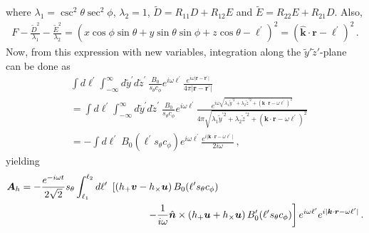\documentclass[a4paper,11pt]{article}
\begin{document}
%
where $ \lambda_{1} = \csc^{2} \theta \sec^{2} \phi $, $ \lambda_{2} = 1 $, $\tilde{D} = R_{11} D + R_{12} E$ and $ \tilde{E} = R_{22} E + R_{21} D $.
%
Also,
\begin{align}
    F - \frac{\tilde{D}^{2}}{ \lambda_{1}} - \frac{\tilde{E}^{2}}{ \lambda_{2}} = \left( x \cos \phi \sin \theta + y \sin \theta \sin \phi +  z \cos \theta  - \ell^{\prime} \right)^{2} = \left( \hat{\bm{k}} \cdot \bm{r} - \ell^{\prime} \right)^{2}  \,.
\end{align}
%
Now, from this expression with new variables, integration along the $ \tilde y' \tilde z' $-plane can be done as
%
\begin{equation}
\begin{aligned}
    & \int  d\ell^{\prime} \int_{-\infty}^{\infty} d\tilde{y}^{\prime} d\tilde{z}^{\prime} ~\frac{ B_{0} }{{s_{\theta} c_{\phi}} } e^{i \omega \ell^{\prime}} \frac{e^{i \omega \vert \bm{r} - \bm{r}^{\prime} \vert} }{ 4 \pi \vert \bm{r} - \bm{r}^{\prime} \vert }  \\
     & = \int  d\ell^{\prime}   \int_{-\infty}^{\infty} d\tilde{y}^{\prime} d\tilde{z}^{\prime} ~\frac{ B_{0} }{{s_{\theta} c_{\phi}} }  e^{i \omega \ell^{\prime}} \frac{e^{i \omega \sqrt{   \lambda_{1} \tilde{y}^{\prime 2} +  \lambda_{2} \tilde{z}^{\prime 2} +  ( \bm{k} \cdot \bm{r} - \omega \ell^{\prime} )^{2}  } } }{ 4 \pi \sqrt{   \lambda_{1} \tilde{y}^{\prime 2} +  \lambda_{2} \tilde{z}^{\prime 2} +  ( \bm{k} \cdot \bm{r} - \omega \ell^{\prime} )^{2}  } }  \\
      & = - \int d\ell^{\prime}   ~B_{0}(\ell^{\prime} s_{\theta} c_{\phi} ) e^{i \omega \ell^{\prime}}  \frac{e^{i \vert \bm{k} \cdot \bm{r} - \omega \ell^{\prime} \vert  }}{  2 i \omega } \,,
\end{aligned}
\end{equation}
%
yielding
%
\begin{equation}
\begin{aligned}
    \bm{A}_{h} 
    &  = 
-\frac{e^{- i \omega t}}{2\sqrt{2}}  s_{\theta} \int_{\ell_{1}}^{\ell_{2}} d\ell^{\prime} ~ \left[  \left(  h_{+} \bm{v} - h_{\times} \bm{u}  \right)  B_{0}(\ell^{\prime} s_{\theta} c_{\phi})  \right. \\
& \hspace{4.5cm} \left. - \frac{1}{i \omega}  \hat{\bm{n}} \times \left(  h_{+} \bm{u} + h_{\times} \bm{u}  \right)  B_{0}^{\prime}(\ell^{\prime} s_{\theta} c_{\phi})  \right]
  e^{i \omega \ell^{\prime}}  e^{i \vert \bm{k} \cdot \bm{r} - \omega \ell^{\prime} \vert  } \,. 
\end{aligned}    
\end{equation}
\end{document}
